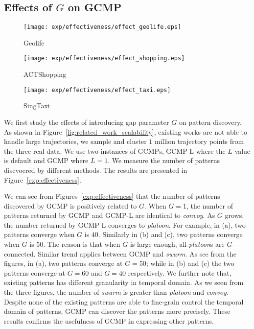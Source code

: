 \subsection{Effects of $G$ on GCMP}
\begin{figure*}[t]
\centering
    \begin{subfigure}[b]{0.3\textwidth}
        \texttt{[image: exp/effectiveness/effect\_geolife.eps]}
        \caption{Geolife}
    \end{subfigure}
    \begin{subfigure}[b]{0.33\textwidth}
        \texttt{[image: exp/effectiveness/effect\_shopping.eps]}
        \caption{ACTShopping}
    \end{subfigure}
    \begin{subfigure}[b]{0.3\textwidth}
        \texttt{[image: exp/effectiveness/effect\_taxi.eps]}
        \caption{SingTaxi}
    \end{subfigure}
\caption{Effectiveness of GCMP model on sampled datasets.}
\label{exp:effectiveness}
\end{figure*}
We first study the effects of introducing gap parameter $G$ on pattern discovery.
As shown in Figure~\ref{fig:related_work_scalability},
existing works are not able to handle large trajectories, 
we sample and cluster $1$ million trajectory points from the three real data.
We use two instances of GCMPs, GCMP-L where the $L$ value is default and GCMP where $L = 1$.  We measure the number
of patterns discvoered by different methods. The results are presented in Figure~\ref{exp:effectiveness}.

We can see from Figures~\ref{exp:effectiveness} that the number of patterns
discovered by GCMP is positively related to $G$. When $G =1$, the number
of patterns returned by GCMP and GCMP-L are identical to \emph{convoy}. As $G$ grows,
the number returned by GCMP-L converges to \emph{platoon}. For example, in (a), two
patterns converge when $G$ is $40$. Similarly in (b) and (c), two patterns converge
when $G$ is $50$. The reason is that when $G$ is large enough,
 all \emph{platoon}s are $G$-connected. Similar
 trend applies between GCMP and \emph{swarm}. As see from the figures, in (a), two
 patterns converge at $G=50$; while in (b) and (c) the two patterns converge
 at $G=60$ and $G=40$ respectively. We further
 note that, existing patterns has different granularity in temporal domain. As we seen
 from the three figures, the number of \emph{swarm} is greater than \emph{platoon} and
 \emph{convoy}. Despite none of the existing patterns are able to fine-grain control
 the temporal domain of patterns, GCMP can discover the patterns more precisely. 
 These results confirms the usefulness of GCMP in expressing other patterns.
  



